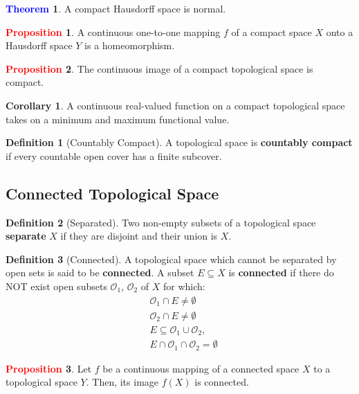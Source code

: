 \documentclass[11pt]{article}
\newcommand{\open}[0]{\mathcal{O}}
\theoremstyle{definition}
\theoremstyle{definition}
\newtheorem{theorem}{\textcolor{blue}{Theorem}}
\newtheorem{corollary}{Corollary}
\theoremstyle{definition}
\newtheorem{definition}{\textcolor{OliveGreen}{Definition}}
\newtheorem{prop}{\textcolor{red}{Proposition}}
\theoremstyle{remark}
\begin{document}
\begin{theorem}
	A compact Hausdorff space is normal. 
\end{theorem}

\begin{prop}
	A continuous one-to-one mapping $f$ of a compact space $X$ onto a Hausdorff space $Y$ is a homeomorphism. 
\end{prop}

\begin{prop}
	The continuous image of a compact topological space is compact. 
\end{prop}

\begin{corollary}
	A continuous real-valued function on a compact topological space takes on a minimum and maximum functional value. 
\end{corollary}

\begin{definition}[Countably Compact] 
	A topological space is \textbf{countably compact} if every countable open cover has a finite subcover.
\end{definition}

\subsection{Connected Topological Space}

\begin{definition}[Separated]
	Two non-empty subsets of a topological space \textbf{separate} $X$ if they are disjoint and their union is $X$. 
\end{definition}

\begin{definition}[Connected]
	A topological space which cannot be separated by open sets is said to be \textbf{connected}. A subset $E \subseteq X$ is \textbf{connected} if there do NOT exist open subsets $\open_1$, $\open_2$ of $X$ for which: 
	\begin{align*}
		& \open_1 \cap E \neq \emptyset \\
		& \open_2 \cap E \neq \emptyset \\
		& E \subseteq \open_1 \cup \open_2, \\
		& E \cap \open_1 \cap \open_2 = \emptyset 	
	\end{align*}
\end{definition}

\begin{prop}
	Let $f$ be a continuous mapping of a connected space $X$ to a topological space $Y$. Then, its image $f(X)$ is connected. 
\end{prop}
\end{document}
